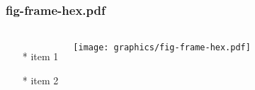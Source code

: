 \begin{frame} \frametitle{fig-frame-hex.pdf}
    \begin{columns}[c]
        \begin{itemize}
            \item[*] item 1
            \item[*] item 2
        \end{itemize}
        \begin{minipage}{\linewidth}
            \begin{center}
            \texttt{[image: graphics/fig-frame-hex.pdf]}
            \label{gfx:fig-frame-hex.pdf}
            \end{center}
        \end{minipage}
    \end{columns}
\end{frame}
